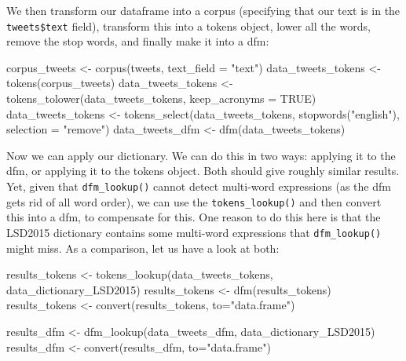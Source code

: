 \documentclass[
]{article}
\newenvironment{Shaded}{\begin{snugshade}}{\end{snugshade}}
\newcommand{\AttributeTok}[1]{\textcolor[rgb]{0.77,0.63,0.00}{#1}}
\newcommand{\ConstantTok}[1]{\textcolor[rgb]{0.00,0.00,0.00}{#1}}
\newcommand{\FunctionTok}[1]{\textcolor[rgb]{0.00,0.00,0.00}{#1}}
\newcommand{\NormalTok}[1]{#1}
\newcommand{\OtherTok}[1]{\textcolor[rgb]{0.56,0.35,0.01}{#1}}
\newcommand{\StringTok}[1]{\textcolor[rgb]{0.31,0.60,0.02}{#1}}
\begin{document}
We then transform our dataframe into a corpus (specifying that our text is in the \texttt{tweets\$text} field), transform this into a tokens object, lower all the words, remove the stop words, and finally make it into a dfm:

\begin{Shaded}
\begin{Highlighting}[]
\NormalTok{corpus\_tweets }\OtherTok{\textless{}{-}} \FunctionTok{corpus}\NormalTok{(tweets, }\AttributeTok{text\_field =} \StringTok{"text"}\NormalTok{)}
\NormalTok{data\_tweets\_tokens }\OtherTok{\textless{}{-}} \FunctionTok{tokens}\NormalTok{(corpus\_tweets)}
\NormalTok{data\_tweets\_tokens }\OtherTok{\textless{}{-}} \FunctionTok{tokens\_tolower}\NormalTok{(data\_tweets\_tokens, }\AttributeTok{keep\_acronyms =} \ConstantTok{TRUE}\NormalTok{)}
\NormalTok{data\_tweets\_tokens }\OtherTok{\textless{}{-}} \FunctionTok{tokens\_select}\NormalTok{(data\_tweets\_tokens, }\FunctionTok{stopwords}\NormalTok{(}\StringTok{"english"}\NormalTok{), }\AttributeTok{selection =} \StringTok{"remove"}\NormalTok{)}
\NormalTok{data\_tweets\_dfm }\OtherTok{\textless{}{-}} \FunctionTok{dfm}\NormalTok{(data\_tweets\_tokens)}
\end{Highlighting}
\end{Shaded}

Now we can apply our dictionary. We can do this in two ways: applying it to the dfm, or applying it to the tokens object. Both should give roughly similar results. Yet, given that \texttt{dfm\_lookup()} cannot detect multi-word expressions (as the dfm gets rid of all word order), we can use the \texttt{tokens\_lookup()} and then convert this into a dfm, to compensate for this. One reason to do this here is that the LSD2015 dictionary contains some multi-word expressions that \texttt{dfm\_lookup()} might miss. As a comparison, let us have a look at both:

\begin{Shaded}
\begin{Highlighting}[]
\NormalTok{results\_tokens }\OtherTok{\textless{}{-}} \FunctionTok{tokens\_lookup}\NormalTok{(data\_tweets\_tokens, data\_dictionary\_LSD2015)}
\NormalTok{results\_tokens }\OtherTok{\textless{}{-}} \FunctionTok{dfm}\NormalTok{(results\_tokens)}
\NormalTok{results\_tokens }\OtherTok{\textless{}{-}} \FunctionTok{convert}\NormalTok{(results\_tokens, }\AttributeTok{to=}\StringTok{"data.frame"}\NormalTok{)}

\NormalTok{results\_dfm }\OtherTok{\textless{}{-}} \FunctionTok{dfm\_lookup}\NormalTok{(data\_tweets\_dfm, data\_dictionary\_LSD2015)}
\NormalTok{results\_dfm }\OtherTok{\textless{}{-}} \FunctionTok{convert}\NormalTok{(results\_dfm, }\AttributeTok{to=}\StringTok{"data.frame"}\NormalTok{)}
\end{Highlighting}
\end{Shaded}
\end{document}
